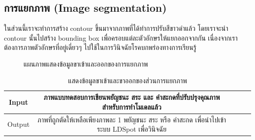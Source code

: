 \documentclass[12pt,oneside,openright,a4paper]{cpe-thai-project}
\begin{document}
  \subsection{การแยกภาพ (Image segmentation)}
  ในส่วนนี้เราจะทำการสร้าง contour ขึ้นมาจากภาพที่ได้ทำการปรับสีขาวดำแล้ว โดยเราจะนำ contour นั้นไปสร้าง bounding box
   เพื่อครอบแต่ละตัวอักษรให้แยกออกจากกัน เนื่องจากเราต้องการภาพตัวอักษรที่อยู่เดี่ยวๆ ไปใช้ในการวินิจฉัยโรคบกพร่องทางการเรียนรู้ 
  \begin{figure}[!ht]\centering
    \setlength{\fboxrule}{0.2mm} %
    \setlength{\fboxsep}{1cm}
    \caption{แผนภาพแสดงข้อมูลขาเข้าและออกของการแยกภาพ}\label{fig:system}
   \end{figure}
  \begin{table}[!h]\centering
    \caption{แสดงข้อมูลขาเข้าและขาออกของส่วนการแยกภาพ}\label{tbl:application1}
    \begin{tabular}{c|c|l|rr} \hline
    Input & ภาพแบบทดสอบการเขียนพยัญชนะ สระ และ คำสะกดที่ปรับปรุงคุณภาพสำหรับการทำโมเดลแล้ว  \\ \hline
    Output & ภาพที่ถูกตัดให้เหลือเพียงภาพละ 1 พยัญชนะ สระ หรือ คำสะกด เพื่อนำไปเข้าระบบ LDSpot เพื่อวินิจฉัย\\ \hline
    \end{tabular}
    \end{table}

  \newpage
\end{document}
